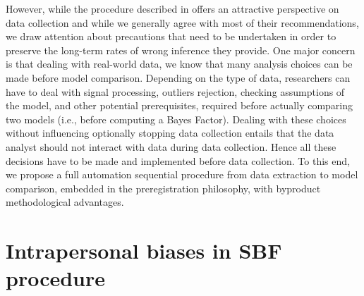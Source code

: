 \documentclass[a4paper,man,natbib,floatsintext,donotrepeattitle]{apa6}
\begin{document}
However, while the procedure described in \cite{schonbrodt_sequential_2017} offers an attractive perspective on data collection and while we generally agree with most of their recommendations, we draw attention about precautions that need to be undertaken in order to preserve the long-term rates of wrong inference they provide. One major concern is that dealing with real-world data, we know that many analysis choices can be made before model comparison. Depending on the type of data, researchers can have to deal with signal processing, outliers rejection, checking assumptions of the model, and other potential prerequisites, required before actually comparing two models (i.e., before computing a Bayes Factor). Dealing with these choices without influencing optionally stopping data collection entails that the data analyst should not interact with data during data collection. Hence all these decisions have to be made and implemented before data collection. To this end, we propose a full automation sequential procedure from data extraction to model comparison, embedded in the preregistration philosophy, with byproduct methodological advantages.


\section{Intrapersonal biases in SBF procedure}
\end{document}
